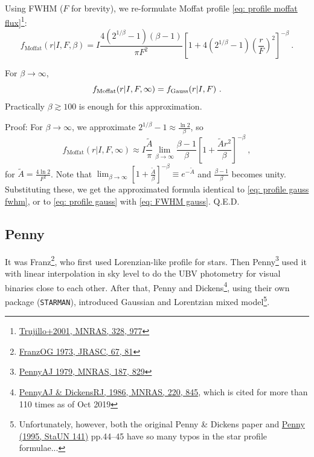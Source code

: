 Using FWHM ($ F $ for brevity), we re-formulate Moffat profile \cref{eq: profile moffat flux}\footnote{\href{https://ui.adsabs.harvard.edu/abs/2001MNRAS.328..977T/abstract}{Trujillo+2001, MNRAS, 328, 977}}:
\begin{equation}\label{eq: profile moffat fwhm}
  f_\mathrm{Moffat}(r|I, F, \beta)
    = I \frac{4(2^{1/\beta} - 1) (\beta - 1)}{\pi F^2}
      \left [ 1 + 4(2^{1/\beta} - 1) \left ( \frac{r}{F} \right )^2 \right ]^{-\beta} ~.
\end{equation}

\begin{thm}
For $ \beta \rightarrow \infty $,
\begin{equation}
  f_{\rm Moffat} (r|I, F, \infty) = f_{\rm Gauss}(r|I, F) ~.
\end{equation}
Practically $ \beta \gtrsim 100 $ is enough for this approximation.
\end{thm}
Proof: For $ \beta \rightarrow \infty $, we approximate $ 2^{1/\beta} - 1 \approx \frac{\ln 2}{\beta} $, so
\begin{equation*}
  f_\mathrm{Moffat}(r|I, F, \infty)
    \approx I \frac{\tilde{A}}{\pi} 
      \lim_{\beta \rightarrow \infty} \frac{\beta-1}{\beta} 
      \left [ 1 + \frac{\tilde{A} r^2}{\beta} \right ]^{-\beta} ~,
\end{equation*}
for $ \tilde{A} = \frac{4 \ln 2}{F^2} $. Note that $ \lim_{\beta \rightarrow \infty} \left [ 1 + \frac{\tilde{A}}{\beta} \right ]^{-\beta} \equiv e^{-\tilde{A}} $ and $ \frac{\beta-1}{\beta} $ becomes unity. Substituting these, we get the approximated formula identical to \cref{eq: profile gauss fwhm}, or to \cref{eq: profile gauss} with \cref{eq: FWHM gauss}. Q.E.D.


\subsection{Penny}
It was Franz\footnote{ \href {https://ui.adsabs.harvard.edu/abs/1973JRASC..67...81F/abstract} {FranzOG 1973, JRASC, 67, 81}}, who first used Lorenzian-like profile for stars. Then Penny\footnote{ \href {https://ui.adsabs.harvard.edu/abs/1979MNRAS.187..829P/abstract} {PennyAJ 1979, MNRAS, 187, 829}} used it with linear interpolation in sky level to do the UBV photometry for visual binaries close to each other. After that, Penny and Dickens\footnote{ \href {https://ui.adsabs.harvard.edu/abs/1986MNRAS.220..845P/abstract} {PennyAJ \& DickensRJ, 1986, MNRAS, 220, 845}, which is cited for more than 110 times as of Oct 2019}, using their own package (\texttt{STARMAN}), introduced Gaussian and Lorentzian mixed model\footnote{Unfortunately, however, both the original Penny \& Dickens paper and \href{https://ui.adsabs.harvard.edu/abs/1995StaUN.141.....P/abstract}{Penny (1995, StaUN 141)} pp.44--45 have so many typos in the star profile formulae...}. 

